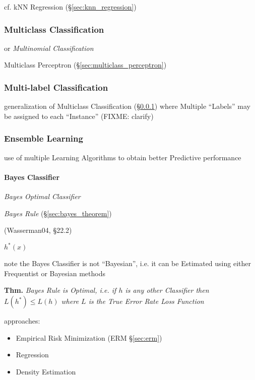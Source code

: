 cf. kNN Regression (\S\ref{sec:knn_regression})



\subsubsection{Multiclass Classification}\label{sec:multiclass}

or \emph{Multinomial Classification}

Multiclass Perceptron (\S\ref{sec:multiclass_perceptron})



\subsubsection{Multi-label Classification}\label{sec:multilabel}

generalization of Multiclass Classification (\S\ref{sec:multiclass}) where
Multiple ``Labels'' may be assigned to each ``Instance'' (FIXME: clarify)



\subsubsection{Ensemble Learning}\label{sec:ensemble_learning}

use of multiple Learning Algorithms to obtain better Predictive performance



\paragraph{Bayes Classifier}\label{sec:bayes_classifier}\hfill

\emph{Bayes Optimal Classifier}

\emph{Bayes Rule} (\S\ref{sec:bayes_theorem})

(Wasserman04, \S22.2)

$h^*(x)$

note the Bayes Classifier is not ``Bayesian'', i.e. it can be Estimated using
either Frequentist or Bayesian methods

\textbf{Thm.} \emph{Bayes Rule is Optimal, i.e. if $h$ is any other Classifier
  then $L(h^*) \leq L(h)$ where $L$ is the True Error Rate Loss Function}

approaches:
\begin{itemize}
  \item Empirical Risk Minimization (ERM \S\ref{sec:erm})
  \item Regression
  \item Density Estimation
\end{itemize}

